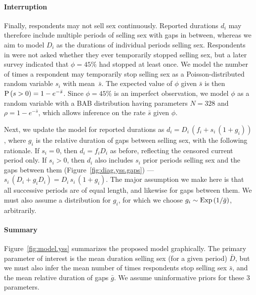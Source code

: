 \paragraph{Interruption}
Finally, respondents may not sell sex continuously.
Reported durations $d_i$ may therefore include
multiple periods of selling sex with gaps in between,
whereas we aim to model $D_i$ as the durations of individual periods selling sex.
Respondents in \cite{Baral2014} were not asked whether they ever temporarily stopped selling sex,
but a later survey \cite{EswKP2014} indicated that $\phi = 45\%$ had stopped at least once.
We model the number of times a respondent may temporarily stop selling sex as
a Poisson-distributed random variable $s_i$ with mean~$\bar{s}$.
The expected value of $\phi$ given $\bar{s}$ is then $\mathrm{P}\,(s > 0) = 1 - e^{-\bar{s}}$.
Since $\phi = 45\%$ is an imperfect observation,
we model $\phi$ as a random variable with a BAB distribution
having parameters $N = 328$ and $\rho = 1 - e^{-\bar{s}}$,
which allows inference on the rate $\bar{s}$ given $\phi$.
\par
Next, we update the model for reported durations as $d_i = D_i\,(f_i + s_i\,(1 + g_i))$,
where $g_i$ is the relative duration of gaps between selling sex,
with the following rationale.
If $s_i = 0$, then $d_i = f_i D_i$ as before, reflecting the censored current period only.
If $s_i > 0$, then $d_i$ also includes $s_i$ prior periods selling sex and the gaps between them
(Figure~\ref{fig:diag.yss.gaps}) --- \ie $s_i\,(D_i + g_i D_i) = D_i\,s_i\,(1 + g_i)$.
The major assumption we make here is that
all successive periods are of equal length, and likewise for gaps between them.
We must also assume a distribution for $g_i$, for which we choose
$g_i \sim \mathrm{Exp}\,(1/\bar{g})$, arbitrarily.
\paragraph{Summary}
Figure~\ref{fig:model.yss} summarizes the proposed model graphically.
The primary parameter of interest is
the mean duration selling sex (for a given period) $\bar{D}$,
but we must also infer
the mean number of times respondents stop selling sex $\bar{s}$, and
the mean relative duration of gaps $\bar{g}$.
We assume uninformative priors for these 3 parameters.
